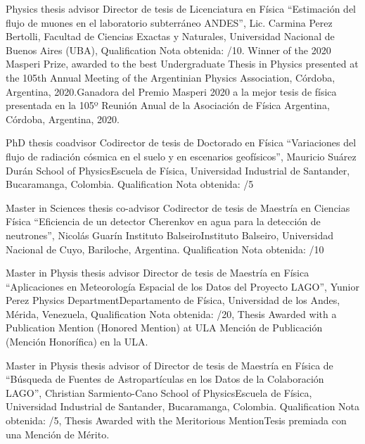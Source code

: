 \ifeng
Physics thesis advisor
 \else
Director de tesis de Licenciatura en Física
 \fi
``Estimación del flujo de muones en el laboratorio subterráneo ANDES'', Lic. Carmina Perez Bertolli, \at Facultad de Ciencias Exactas y Naturales, Universidad Nacional de Buenos Aires (UBA), \ifeng Qualification \else Nota obtenida: /10. \ifeng Winner of the 2020 Masperi Prize, awarded to the best Undergraduate Thesis in Physics presented at the 105th Annual Meeting of the Argentinian Physics Association, Córdoba, Argentina, 2020.\else Ganadora del Premio Masperi 2020 a la mejor tesis de física presentada en la 105º Reunión Anual de la Asociación de Física Argentina, Córdoba, Argentina, 2020. \fi 

\ifeng
PhD thesis coadvisor
 \else
Codirector de tesis de Doctorado en Física
 \fi
``Variaciones del flujo de radiación cósmica en el suelo y en escenarios geofísicos'', Mauricio Suárez Durán \at \ifeng School of Physics\else Escuela de Física\fi, Universidad Industrial de Santander, Bucaramanga, Colombia. \ifeng Qualification \else Nota obtenida: /5

\ifeng
Master in Sciences thesis co-advisor
 \else
Codirector de tesis de Maestría en Ciencias Física
 \fi
``Eficiencia de un detector Cherenkov en agua para la detección de neutrones'', Nicolás Guarín \at \ifeng Instituto Balseiro\else Instituto Balseiro\fi, Universidad Nacional de Cuyo, Bariloche, Argentina. \ifeng Qualification \else Nota obtenida: /10

\ifeng
Master in Physis thesis advisor
 \else
Director de tesis de Maestría en Física
 \fi
 ``Aplicaciones en Meteorología Espacial de los Datos del Proyecto LAGO'', Yunior Perez \at \ifeng Physics Department\else Departamento de Física\fi, Universidad de los Andes, Mérida, Venezuela, \ifeng Qualification \else Nota obtenida: /20, \ifeng Thesis Awarded with a Publication Mention (Honored Mention) at ULA \else Mención de Publicación (Mención Honorífica) en la ULA\fi.

\ifeng
Master in Physis thesis advisor of
 \else
Director de tesis de Maestría en Física de
 \fi
``Búsqueda de Fuentes de Astropartículas en los Datos de la Colaboración LAGO'', Christian Sarmiento-Cano \at \ifeng School of Physics\else Escuela de Física\fi, Universidad Industrial de Santander, Bucaramanga, Colombia. \ifeng Qualification \else Nota obtenida: /5, \ifeng Thesis Awarded with the Meritorious Mention\else Tesis premiada con una Mención de Mérito\fi.

